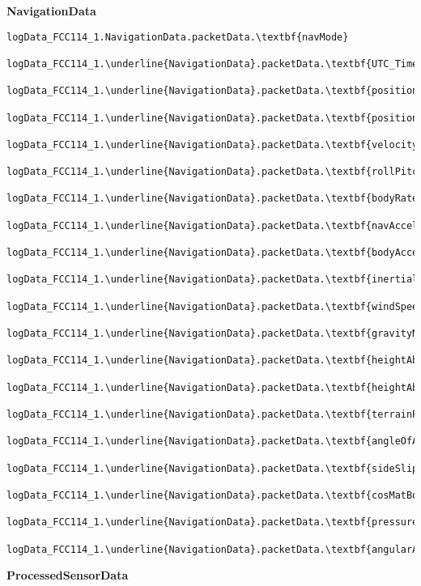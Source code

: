\documentclass[10pt]{extarticle}
\begin{document}
\newpage
{\Large \textbf{NavigationData}}
 \begin{Verbatim}[baselinestretch=.9,commandchars=\\\{\}]
logData_FCC114_1.NavigationData.packetData.\textbf{navMode}

logData_FCC114_1.\underline{NavigationData}.packetData.\textbf{UTC_Time}

logData_FCC114_1.\underline{NavigationData}.packetData.\textbf{positionLLH}

logData_FCC114_1.\underline{NavigationData}.packetData.\textbf{positionNED}

logData_FCC114_1.\underline{NavigationData}.packetData.\textbf{velocityNED}

logData_FCC114_1.\underline{NavigationData}.packetData.\textbf{rollPitchYaw}

logData_FCC114_1.\underline{NavigationData}.packetData.\textbf{bodyRate}

logData_FCC114_1.\underline{NavigationData}.packetData.\textbf{navAccel}

logData_FCC114_1.\underline{NavigationData}.packetData.\textbf{bodyAccel}

logData_FCC114_1.\underline{NavigationData}.packetData.\textbf{inertialAccel}

logData_FCC114_1.\underline{NavigationData}.packetData.\textbf{windSpeed}

logData_FCC114_1.\underline{NavigationData}.packetData.\textbf{gravityNED}

logData_FCC114_1.\underline{NavigationData}.packetData.\textbf{heightAboveGround}

logData_FCC114_1.\underline{NavigationData}.packetData.\textbf{heightAboveGroundRate}

logData_FCC114_1.\underline{NavigationData}.packetData.\textbf{terrainPitchRoll}

logData_FCC114_1.\underline{NavigationData}.packetData.\textbf{angleOfAttackOffset}

logData_FCC114_1.\underline{NavigationData}.packetData.\textbf{sideSlipOffset}

logData_FCC114_1.\underline{NavigationData}.packetData.\textbf{cosMatBodyToNav}

logData_FCC114_1.\underline{NavigationData}.packetData.\textbf{pressureAltitudeOffset}

logData_FCC114_1.\underline{NavigationData}.packetData.\textbf{angularAccel}
\end{Verbatim}
\newpage
{\Large \textbf{ProcessedSensorData}}
\end{document}
